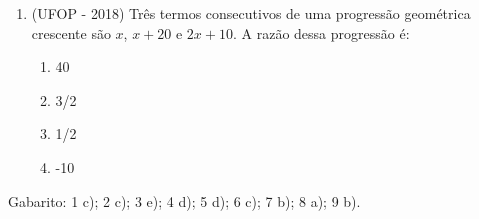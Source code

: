 \begin{enumerate}
\item (UFOP - 2018) Três termos consecutivos de uma progressão geométrica crescente são $x$, $x+20$ e $2x + 10$. A razão dessa progressão é:
\begin{enumerate}
\item 40
\item 3/2
\item 1/2
\item -10 
\end{enumerate}



\end{enumerate}

Gabarito: 1 c); 2 c); 3 e); 4 d); 5 d); 6 c); 7 b); 8 a); 9 b).
